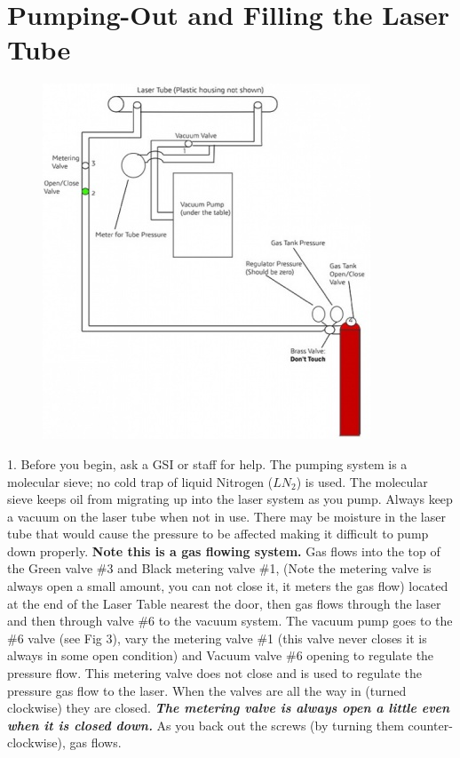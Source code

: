 \documentclass{../lab}
\begin{document}
\section{Pumping-Out and Filling the Laser Tube }


\begin{figure}[h]
    \centering
    \href{http://experimentationlab.berkeley.edu/sites/default/files/upimages/lasergaspic_small.jpg}{\includegraphics[width=\linewidth]{images/lasergaspic_small.jpg}}
    \caption{}
    \label{fig:lasergaspic_small}
\end{figure}

1. Before you begin, ask a GSI or staff for help. The pumping system is a molecular sieve; no cold trap of liquid Nitrogen ($LN_2$) is used. The molecular sieve keeps oil from migrating up into the laser system as you pump. Always keep a vacuum on the laser tube when not in use. There may be moisture in the laser tube that would cause the pressure to be affected making it difficult to pump down properly. \textbf{Note this is a gas flowing system. } Gas flows into the top of the Green valve \#3 and Black metering valve \#1, (Note the metering valve is always open a small amount, you can not close it, it meters the gas flow) located at the end of the Laser Table nearest the door, then gas flows through the laser and then through valve \#6 to the vacuum system. The vacuum pump goes to the \#6 valve (see Fig 3), vary the metering valve \#1 (this valve never closes it is always in some open condition) and Vacuum valve \#6 opening to regulate the pressure flow. This metering valve does not close and is used to regulate the pressure gas flow to the laser. When the valves are all the way in (turned clockwise) they are closed. \emph{\textbf{The metering valve is always open a little even when it is closed down.}} As you back out the screws (by turning them counter-clockwise), gas flows.
\end{document}
